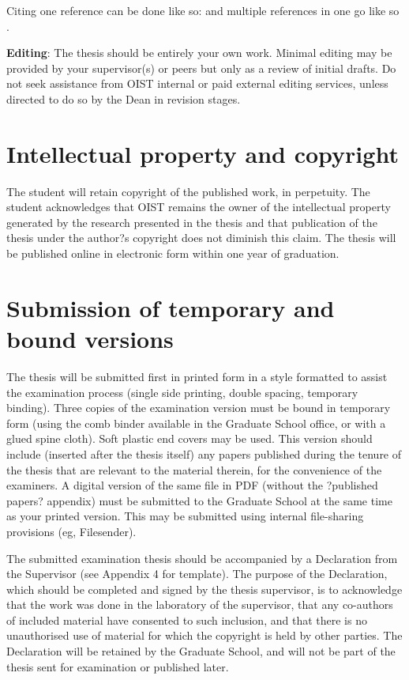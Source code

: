 Citing one reference can be done like so: \cite{Lee98} and multiple references in one go like so \cite{Fil09, Muc10, Kra27}.

\textbf{Editing}:  The thesis should be entirely your own work. Minimal editing may be provided by your supervisor(s) or peers but only as a review of initial drafts.  Do not seek assistance from OIST internal or paid external editing services, unless directed to do so by the Dean in revision stages.

\section{Intellectual property and copyright}

The student will retain copyright of the published work, in perpetuity.  The student acknowledges that OIST remains the owner of the intellectual property generated by the research presented in the thesis and that publication of the thesis under the author?s copyright does not diminish this claim.  The thesis will be published online in electronic form within one year of graduation.


 \section{Submission of temporary and bound versions}

The thesis will be submitted first in printed form in a style formatted to assist the examination process (single side printing, double spacing, temporary binding).  Three copies of the examination version must be bound in temporary form (using the comb binder available in the Graduate School office, or with a glued spine cloth).  Soft plastic end covers may be used. This version should include (inserted after the thesis itself) any papers published during the tenure of the thesis that are relevant to the material therein, for the convenience of the examiners.  A digital version of the same file in PDF (without the ?published papers? appendix) must be submitted to the Graduate School at the same time as your printed version.  This may be submitted using internal file-sharing provisions (eg, Filesender).

The submitted examination thesis should be accompanied by a Declaration from the Supervisor (see Appendix 4 for template).  The purpose of the Declaration, which should be completed and signed by the thesis supervisor, is to acknowledge that the work was done in the laboratory of the supervisor, that any co-authors of included material have consented to such inclusion, and that there is no unauthorised use of material for which the copyright is held by other parties.  The Declaration  will be retained by the Graduate School, and will not be part of the thesis sent for examination or published later.

